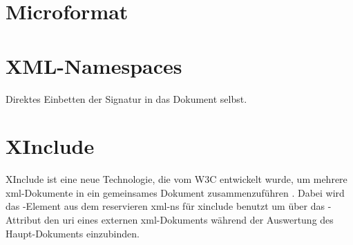 

\section{Microformat}
\todo

\section{XML-Namespaces}
Direktes Einbetten der Signatur in das Dokument selbst.



\section{XInclude}
XInclude ist eine neue Technologie, die vom W3C entwickelt wurde, um mehrere \gls{xml}-Dokumente in ein gemeinsames Dokument zusammenzuführen \cite{xml:oreilly}.
Dabei wird das -Element aus dem reservieren \gls{xml-ns} für \gls{xinclude} benutzt um über das -Attribut den \gls{uri}
eines externen \gls{xml}-Dokuments während der Auswertung des Haupt-Dokuments einzubinden.


